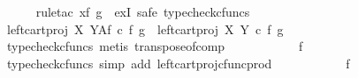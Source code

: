 \begin{isabellebody}
\ \ \ \ \isamarkupfalse%
\ {\isacharparenleft}{\kern0pt}rule{\isacharunderscore}{\kern0pt}tac\ x{\isacharequal}{\kern0pt}{\isachardoublequoteopen}{\isasymlangle}f\isactrlsup {\isasymflat}\ {\isacharcomma}{\kern0pt}g\isactrlsup {\isasymflat}{\isasymrangle}\isactrlsup {\isasymsharp}{\isachardoublequoteclose}\ \ exI{\isacharcomma}{\kern0pt}\ safe{\isacharcomma}{\kern0pt}\ typecheck{\isacharunderscore}{\kern0pt}cfuncs{\isacharparenright}{\kern0pt}\isanewline
\ \ \ \ \ \ \isamarkupfalse%
\ {\isachardoublequoteopen}{\isacharparenleft}{\kern0pt}{\isacharparenleft}{\kern0pt}left{\isacharunderscore}{\kern0pt}cart{\isacharunderscore}{\kern0pt}proj\ X\ Y{\isacharparenright}{\kern0pt}\isactrlbsup A\isactrlesup \isactrlsub f{\isacharparenright}{\kern0pt}\ {\isasymcirc}\isactrlsub c\ {\isasymlangle}f\isactrlsup {\isasymflat}\ {\isacharcomma}{\kern0pt}g\isactrlsup {\isasymflat}{\isasymrangle}\isactrlsup {\isasymsharp}\ {\isacharequal}{\kern0pt}\ {\isacharparenleft}{\kern0pt}{\isacharparenleft}{\kern0pt}left{\isacharunderscore}{\kern0pt}cart{\isacharunderscore}{\kern0pt}proj\ X\ Y{\isacharparenright}{\kern0pt}\ {\isasymcirc}\isactrlsub c\ {\isasymlangle}f\isactrlsup {\isasymflat}\ {\isacharcomma}{\kern0pt}g\isactrlsup {\isasymflat}{\isasymrangle}{\isacharparenright}{\kern0pt}\isactrlsup {\isasymsharp}{\isachardoublequoteclose}\isanewline
\ \ \ \ \ \ \ \ \isamarkupfalse%
\ {\isacharparenleft}{\kern0pt}typecheck{\isacharunderscore}{\kern0pt}cfuncs{\isacharcomma}{\kern0pt}\ metis\ transpose{\isacharunderscore}{\kern0pt}of{\isacharunderscore}{\kern0pt}comp{\isacharparenright}{\kern0pt}\isanewline
\ \ \ \ \ \ \isamarkupfalse%
\ \isamarkupfalse%
\ {\isachardoublequoteopen}{\isachardot}{\kern0pt}{\isachardot}{\kern0pt}{\isachardot}{\kern0pt}\ {\isacharequal}{\kern0pt}\ f\isactrlsup {\isasymflat}\isactrlsup {\isasymsharp}{\isachardoublequoteclose}\isanewline
\ \ \ \ \ \ \ \ \isamarkupfalse%
\ {\isacharparenleft}{\kern0pt}typecheck{\isacharunderscore}{\kern0pt}cfuncs{\isacharcomma}{\kern0pt}\ simp\ add{\isacharcolon}{\kern0pt}\ left{\isacharunderscore}{\kern0pt}cart{\isacharunderscore}{\kern0pt}proj{\isacharunderscore}{\kern0pt}cfunc{\isacharunderscore}{\kern0pt}prod{\isacharparenright}{\kern0pt}\isanewline
\ \ \ \ \ \ \isamarkupfalse%
\ \isamarkupfalse%
\ {\isachardoublequoteopen}{\isachardot}{\kern0pt}{\isachardot}{\kern0pt}{\isachardot}{\kern0pt}\ {\isacharequal}{\kern0pt}\ f{\isachardoublequoteclose}\isanewline
\ \ \ \ \ \ \ \ \isamarkupfalse%

\end{isabellebody}
